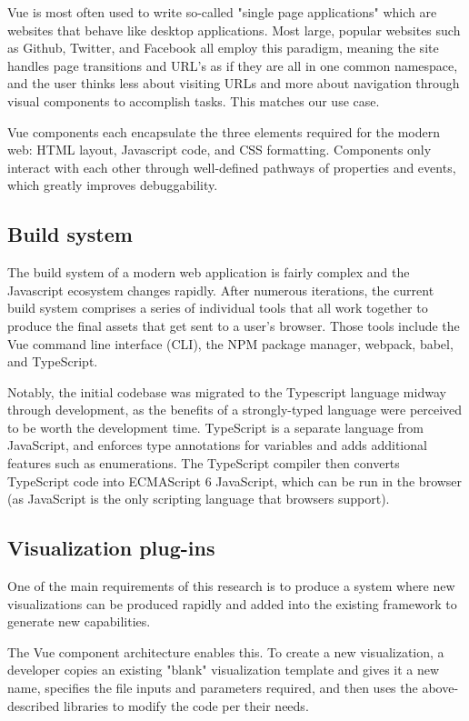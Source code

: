 \documentclass[Afour,sagev,times]{sagej}
\begin{document}
Vue is most often used to write so-called "single page applications" which are websites that behave like desktop applications. Most large, popular websites such as Github, Twitter, and Facebook all employ this paradigm, meaning the site handles page transitions and URL's as if they are all in one common namespace, and the user thinks less about visiting URLs and more about navigation through visual components to accomplish tasks. This matches our use case.

Vue components each encapsulate the three elements required for the modern web: HTML layout, Javascript code, and CSS formatting. Components only interact with each other through well-defined pathways of properties and events, which greatly improves debuggability.

\subsection{Build system}

The build system of a modern web application is fairly complex and the Javascript ecosystem changes rapidly. After numerous iterations, the current build system comprises a series of individual tools that all work together to produce the final assets that get sent to a user's browser. Those tools include the Vue command line interface (CLI), the NPM package manager, webpack, babel, and TypeScript.

Notably, the initial codebase was migrated to the Typescript language midway through development, as the benefits of a strongly-typed language were perceived to be worth the development time. TypeScript is a separate language from JavaScript, and enforces type annotations for variables and adds additional features such as enumerations. The TypeScript compiler then converts TypeScript code into ECMAScript 6 JavaScript, which can be run in the browser (as JavaScript is the only scripting language that browsers support).

\subsection{Visualization plug-ins}

One of the main requirements of this research is to produce a system where new visualizations can be produced rapidly and added into the existing framework to generate new capabilities.

The Vue component architecture enables this. To create a new visualization, a developer copies an existing "blank" visualization template and gives it a new name, specifies the file inputs and parameters required, and then uses the above-described libraries to modify the code per their needs.
\end{document}

